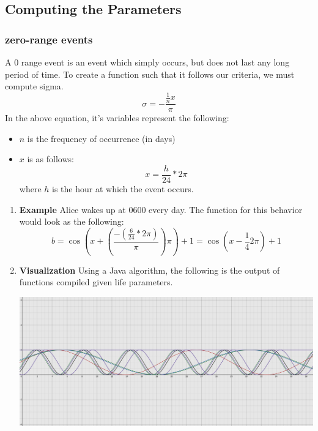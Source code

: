 \documentclass[11pt]{article}
\begin{document}
\subsection{Computing the Parameters}
\label{sec:orgb4d7752}
\subsubsection{zero-range events}
\label{sec:orgbea3c7f}
A 0 range event is an event which simply occurs, but does not last any long period of time. To create a function such that it follows our criteria, we must compute sigma.
\begin{equation}
    \sigma = -\frac{\frac{1}{n}x}{\pi}
\end{equation}
In the above equation, it's variables represent the following:
\begin{itemize}
\item \(n\) is the frequency of occurrence (in days)
\item \(x\) is as follows:
\begin{equation}
  x = \frac{h}{24} * 2\pi
\end{equation}
where \(h\) is the hour at which the event occurs.
\end{itemize}
\begin{enumerate}
\item \textbf{Example}
\label{sec:org3bbf068}
Alice wakes up at 0600 every day. The function for this behavior would look as the following:
\begin{equation}
b = \cos{( x + (\frac{-(\frac{6}{24}*2\pi)}{\pi})\pi )} + 1 = \cos{(x-\frac{1}{4}2\pi)}+1
\end{equation}
\item \textbf{Visualization}
\label{sec:org7422938}
Using a Java algorithm, the following is the output of functions compiled given life parameters.
\begin{center}
\includegraphics[width=.9\linewidth]{./media/life01.jpg}
\end{center}
\end{enumerate}
\end{document}
